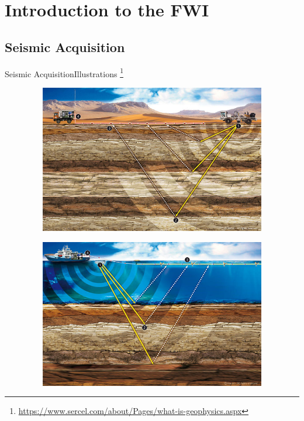 \section{Introduction to the FWI}
\subsection{Seismic Acquisition}

\begin{frame}{Seismic Acquisition}{Illustrations \footnote{\url{https://www.sercel.com/about/Pages/what-is-geophysics.aspx}}}

\begin{overprint}
  \vspace{-0.3cm}
  \begin{figure}
   \includegraphics[width=12cm,height=6.5cm]{image/acquisition_terrestre.png}
  \end{figure}
      \vspace{-0.3cm}
  \begin{figure}
   \includegraphics[width=12cm,height=6.5cm]{image/acquisition_marine.png}
  \end{figure}
  \end{overprint}

\end{frame}

